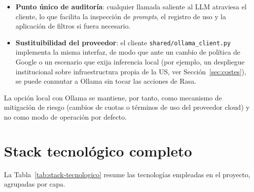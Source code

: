 \begin{itemize}
    \item \textbf{Punto único de auditoría}: cualquier llamada saliente al LLM atraviesa el cliente, lo que facilita la inspección de \textit{prompts}, el registro de uso y la aplicación de filtros si fuera necesario.
    \item \textbf{Sustituibilidad del proveedor}: el cliente \texttt{shared/ollama\_client.py} implementa la misma interfaz, de modo que ante un cambio de política de Google o un escenario que exija inferencia local (por ejemplo, un despliegue institucional sobre infraestructura propia de la US, ver Sección~\ref{sec:costes}), se puede conmutar a Ollama sin tocar las acciones de Rasa.
\end{itemize}

La opción local con Ollama se mantiene, por tanto, como mecanismo de mitigación de riesgo (cambios de cuotas o términos de uso del proveedor cloud) y no como modo de operación por defecto.

\section{Stack tecnológico completo}\label{sec:stack-completo}

La Tabla~\ref{tab:stack-tecnologico} resume las tecnologías empleadas en el proyecto, agrupadas por capa.

